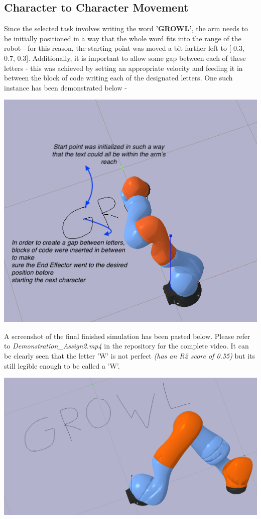 \documentclass[a4paper]{article}
\begin{document}
\subsection{Character to Character Movement}
Since the selected task involves writing the word \textbf{'GROWL'}, the arm needs to be initially positioned in a way that the whole word fits into the range of the robot - for this reason, the starting point was moved a bit farther left to 
[-0.3, 0.7, 0.3]. Additionally, it is important to allow some gap between each of these letters - this was achieved by setting an appropriate velocity and feeding it in between the block of code writing each of the designated letters. One such instance has been demonstrated below - \\
\begin{center}
\includegraphics[scale=0.9]{images/1.png} \\
\end{center}

A screenshot of the final finished simulation has been pasted below. Please refer to {\it Demonstration\_Assign2.mp4} in the repository for the complete video. It can be clearly seen that the letter 'W' is not perfect {\it (has an R2 score of 0.55)} but its still legible enough to be called a 'W'. \\
\begin{center}
\includegraphics[scale=0.6]{images/2.png}\\
\end{center}
\end{document}
